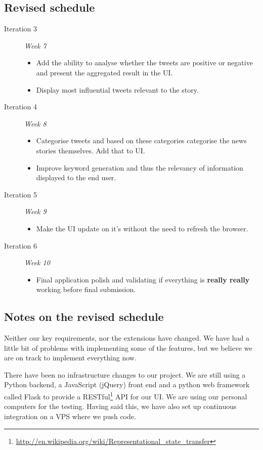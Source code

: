 \documentclass[a4paper,12pt]{article}
\begin{document}
	\subsection{Revised schedule}
	\begin{description}
   \item[Iteration 3] \emph{Week 7}
   \begin{itemize}
     \item Add the ability to analyse whether the tweets are positive or negative and present the aggregated result in the UI.
     \item Display most influential tweets relevant to the story.
   \end{itemize}
   \item[Iteration 4] \emph{Week 8}
   \begin{itemize}
     \item Categorise tweets and based on these categories categorise the news stories themselves. Add that to UI.
     \item Improve keyword generation and thus the relevancy of information displayed to the end user.
   \end{itemize}
   \item[Iteration 5] \emph{Week 9}
   \begin{itemize}
     \item Make the UI update on it's without the need to refresh the browser.
   \end{itemize}
   \item[Iteration 6] \emph{Week 10}
   \begin{itemize}
     \item Final application polish and validating if everything is \textbf{really really} working before final submission.
   \end{itemize}
  \end{description}
  
  \subsection{Notes on the revised schedule}
	
	Neither our key requirements, nor the extensions have changed. We have had a little bit of problems with implementing some of the features, but we believe we are on track to implement everything now.
  
  There have been no infrastructure changes to our project. We are still using a Python backend, a JavaScript (jQuery) front end and a python web framework called Flask to provide a RESTful\footnote{\url{http://en.wikipedia.org/wiki/Representational_state_transfer}} API for our UI. We are using our personal computers for the testing. Having said this, we have also set up continuous integration on a VPS where we push code.
\end{document}
